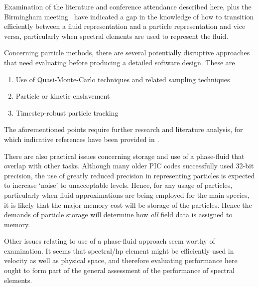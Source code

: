 Examination of the literature and conference attendance described here,
plus the Birmingham meeting~\cite{y1re111a,y1re111b,y1re121} have indicated
a gap in the knowledge of how to transition efficiently between
a fluid representation and a particle representation and vice versa, particularly when spectral
elements are used to represent the fluid. 

Concerning particle methods, there are several potentially disruptive approaches that need
evaluating before producing a detailed software design. These are
\begin{enumerate}
\item Use of Quasi-Monte-Carlo techniques and related sampling techniques
\item Particle or kinetic enslavement
\item Timestep-robust particle tracking
\end{enumerate}

The aforementioned points require further research and literature analysis, for which
indicative references have been provided in .

There are also practical issues concerning storage and use of a phase-fluid that overlap with other tasks.
Although many older PIC codes successfully used 32-bit precision,
the use of greatly reduced precision in representing particles is expected to
increase `noise' to unacceptable levels.
Hence, for any usage of particles, particularly
when fluid approximations are being employed for the main species, it is likely that
the major memory cost will be storage of the particles. Hence the demands of particle
storage will determine how \emph{all} field data is assigned to memory.

Other issues relating to use of a phase-fluid approach
seem worthy of examination. It seems that spectral/hp
element might be efficiently used in velocity as well as physical space, and 
therefore evaluating performance here ought to
form part of the general assessment of the performance of spectral elements.

